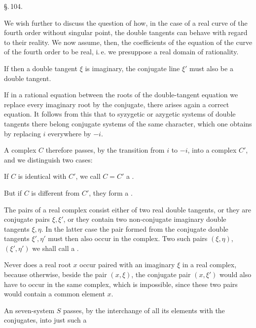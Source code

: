 
\S.\,104.


We wish further to discuss the question of how, in the case
of a real curve of the fourth order without singular point, the double
tangents can behave with regard to their reality. We
now assume, then, the coefficients of the equation of the curve
of the fourth order to be real, i.\,e. we presuppose a real domain
of rationality.

If then a double tangent $\xi$ is imaginary, the conjugate
line $\xi'$ must also be a double tangent.

If in a rational equation between the roots of the
double-tangent equation we replace every imaginary root by
the conjugate, there arises again a correct equation.
It follows from this that to syzygetic or azygetic
systems of %
double tangents there belong conjugate systems of the same
character, which one obtains by replacing $i$ everywhere
by $-i$.

A  complex $C$ therefore passes, by the transition
from $i$ to $-i$, into a  complex $C'$, and we
distinguish two cases:

If $C$ is identical with $C'$, we call $C = C'$ a .

But if $C$ is different from $C'$, they form a .

The pairs of a real complex consist either of
two real double tangents, or they are conjugate pairs $\xi, \xi'$,
or they contain two non-conjugate imaginary double tangents
$\xi, \eta$. In the latter case the pair formed from
the conjugate double tangents $\xi', \eta'$ must then also occur
in the complex. Two such pairs $(\xi, \eta)$, $(\xi', \eta')$ we shall call a
.

Never does a real root $x$ occur paired with an imaginary
$\xi$ in a real complex, because otherwise, beside
the pair $(x, \xi)$, the conjugate pair $(x, \xi')$ would also have to occur in the same
complex, which is impossible, since these two
pairs would contain a common element $x$.

An  seven-system $S$ passes, by the interchange
of all its elements with the conjugates, into just such a
